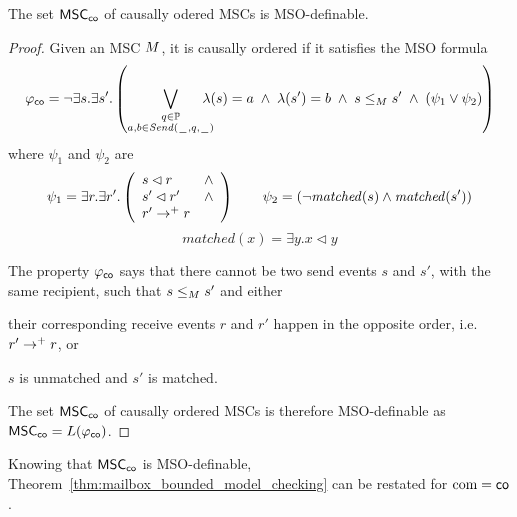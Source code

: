\documentclass{article}
\begin{document}
\begin{proposition}\label{prop:co_mso}
	The set $\mathsf{MSC}_{\mathsf{co}}$ of causally odered MSCs is MSO-definable.
\end{proposition}
\begin{proof}
	Given an MSC $M$, it is causally ordered if it satisfies the MSO formula
	\[
	\varphi_{\mathsf{co}} =
	\neg \exists s.\exists s'. \left(
	\bigvee_{\substack{q \in \mathbb{P}\\a,b \in {\mathit{Send}(\hspace{0.1em}\underline{\hspace{0.5em}}\hspace{0.1em},q,\hspace{0.1em}\underline{\hspace{0.5em}}\hspace{0.1em})}}}\hspace{-1em}
	\lambda(s) = a \;\wedge\; \lambda(s') = b
	\;\wedge\; s \le_M s' \;\wedge\;
	(\psi_1 \vee \psi_2 ) 
	\right)
	\]
	where $\psi_1$ and $\psi_2$ are
	\[
	\psi_1 = \exists r.\exists r'.\left(
	\begin{array}{ll}
		s \lhd r & \wedge\\
		s' \lhd r' & \wedge\\
		r' \to^+ r &
	\end{array} 
	\right) \quad \quad
	\psi_2 = (\neg \mathit{matched}(s) \wedge \mathit{matched}(s'))
	\]
	\[
	matched(x) = \exists y. x \lhd y
	\]

	The property $\varphi_{\mathsf{co}}$ says that there cannot be two send events $s$ and $s'$, with the same recipient, such that $s \le_M s'$ and either
	\begin{enumerate*}[label={(\roman*)}]
		\item their corresponding receive events $r$ and $r'$ happen in the opposite order, i.e. $r' \to^+ r$, or
		\item $s$ is unmatched and $s'$ is matched.
	\end{enumerate*}
	The set $\mathsf{MSC}_{\mathsf{co}}$ of causally ordered MSCs is therefore MSO-definable as $\mathsf{MSC}_{\mathsf{co}}=L(\varphi_{\mathsf{co}})$.

\end{proof}

Knowing that $\mathsf{MSC}_{\mathsf{co}}$ is MSO-definable, Theorem~\ref{thm:mailbox_bounded_model_checking} can be restated for $\textup{com} = \mathsf{co}$.
\end{document}
